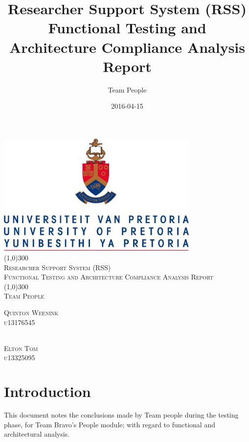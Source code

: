 \documentclass{article}
\title{
Researcher Support System (RSS)\\
Functional Testing and Architecture Compliance Analysis Report
}
\date{2016-04-15}
\author{Team People}
\begin{document}
\begin{titlepage}
	\begin{center}
		\includegraphics[width=10cm]{UP.jpg}  \\
		[1cm]
		\line(1,0){300} \\
		[0.3cm]
		\textsc{\Large
			Researcher Support System (RSS)\\
			Functional Testing and Architecture Compliance Analysis Report
		}\\
		[0.1cm]
		\line(1,0){300} \\
		[0.4cm]
		\textsc{\Large
			Team People
		} \\

	\end{center}
	\begin{flushright}
	\textsc{\Large
	Quinton Weenink\\ 
	u13176545\\
	}
	
	\textsc{\large\\
	Elton Tom\\ 
	u13325095\\ 
	}
	
	\end{flushright}
\end{titlepage}

\tableofcontents
\thispagestyle{empty}
\cleardoublepage

\setcounter{page}{1}
\section{Introduction}
This document notes the conclusions made by Team people during the testing phase, for Team Bravo's People module; with regard to functional and architectural analysis.\\

\newpage
\end{document}
